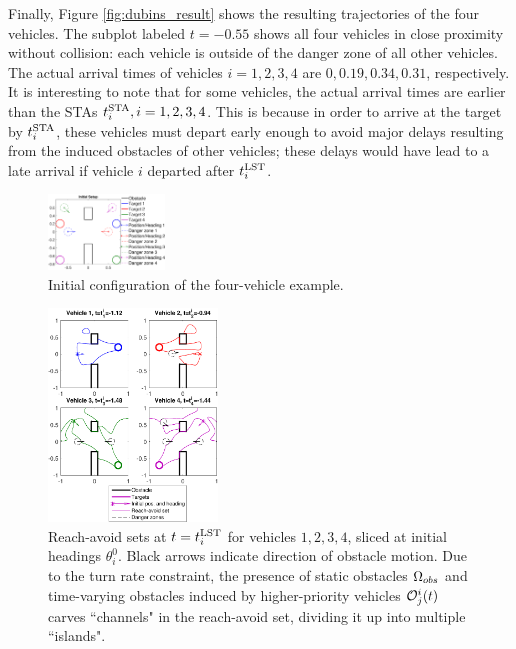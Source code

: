 Finally, Figure \ref{fig:dubins_result} shows the resulting trajectories of the four vehicles. The subplot labeled $t=-0.55$ shows all four vehicles in close proximity without collision: each vehicle is outside of the danger zone of all other vehicles. The actual arrival times of vehicles $i=1,2,3,4$ are $0, 0.19, 0.34, 0.31$, respectively. It is interesting to note that for some vehicles, the actual arrival times are earlier than the STAs $t^{\text{STA}}_i, i=1,2,3,4$. This is because in order to arrive at the target by $t^{\text{STA}}_i$, these vehicles must depart early enough to avoid major delays  resulting from the induced obstacles of other vehicles; these delays would have lead to a late arrival if vehicle $i$ departed after $t^{\text{LST}}_i$.

\begin{figure}
	\centering
	\includegraphics[width=0.275\textwidth]{"fig/dubins_ic"}
	\caption{Initial configuration of the four-vehicle example.}
	\label{fig:dubins_ic}
\end{figure}

\begin{figure}
	\centering
	\includegraphics[width=0.4\textwidth]{"fig/dubins_reach_all"}
	\caption{Reach-avoid sets at $t=t^{\text{LST}}_i$ for vehicles $1,2,3,4$, sliced at initial headings $\theta_i^0$. Black arrows indicate direction of obstacle motion. Due to the turn rate constraint, the presence of static obstacles $\Omega_{obs}$ and time-varying obstacles induced by higher-priority vehicles $\mathcal{O}^i_j(t)$ carves ``channels" in the reach-avoid set, dividing it up into multiple ``islands".}
	\label{fig:dubins_reach_all}
\end{figure}


